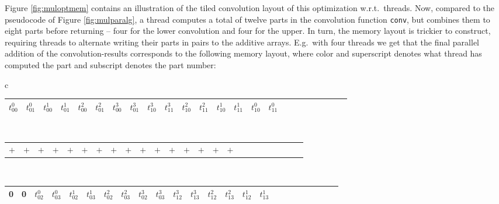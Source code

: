Figure \ref{fig:muloptmem} contains an illustration of the tiled convolution
layout of this optimization w.r.t.\ threads. Now, compared to the pseudocode of
Figure \ref{fig:mulparalg}, a thread computes a total of twelve parts in the
convolution function \texttt{conv}, but combines them to eight parts before
returning -- four for the lower convolution and four for the upper. In turn, the
memory layout is trickier to construct, requiring threads to alternate writing
their parts in pairs to the additive arrays. E.g.\ with four threads we get that
the final parallel addition of the convolution-results corresponds to the
following memory layout, where color and superscript denotes what thread has
computed the part and subscript denotes the part number:

\begin{center}
  \small
  \begin{tabular}{c}
    \begin{tabular}{|C{0.4cm}|C{0.4cm}|C{0.4cm}|C{0.4cm}|C{0.4cm}|C{0.4cm}|C{0.4cm}|C{0.4cm}|C{0.4cm}|C{0.4cm}|C{0.4cm}|C{0.4cm}|C{0.4cm}|C{0.4cm}|C{0.4cm}|C{0.4cm}|C{0.4cm}|C{0.4cm}|C{0.4cm}|C{0.4cm}|C{0.4cm}|C{0.4cm}|C{0.4cm}|C{0.4cm}|}
      \hline
      \color{Crimson}$t^0_{00}$ & \color{Crimson}$t^0_{01}$ & \color{RoyalBlue}$t^1_{00}$ & \color{RoyalBlue}$t^1_{01}$  & \color{ForestGreen}$t^2_{00}$ & \color{ForestGreen}$t^2_{01}$  & \color{Chocolate}$t^3_{00}$ & \color{Chocolate}$t^3_{01}$  & \color{Chocolate}$t^3_{10}$ & \color{Chocolate}$t^3_{11}$  & \color{ForestGreen}$t^2_{10}$ & \color{ForestGreen}$t^2_{11}$  & \color{RoyalBlue}$t^1_{10}$ & \color{RoyalBlue}$t^1_{11}$ & \color{Crimson}$t^0_{10}$ & \color{Crimson}$t^0_{11}$ \\
      \hline
    \end{tabular}\\
    \begin{tabular}{C{0.41cm}C{0.41cm}C{0.41cm}C{0.41cm}C{0.41cm}C{0.41cm}C{0.41cm}C{0.41cm}C{0.41cm}C{0.41cm}C{0.41cm}C{0.41cm}C{0.41cm}C{0.41cm}C{0.41cm}C{0.41cm}C{0.41cm}C{0.41cm}C{0.41cm}C{0.41cm}C{0.41cm}C{0.41cm}C{0.41cm}C{0.41cm}}
      $+$ & $+$ & $+$ & $+$  & $+$ & $+$ & $+$ & $+$  & $+$ & $+$ & $+$ & $+$  & $+$ & $+$ & $+$ & $+$
    \end{tabular}\\
    \begin{tabular}{|C{0.4cm}|C{0.4cm}|C{0.4cm}|C{0.4cm}|C{0.4cm}|C{0.4cm}|C{0.4cm}|C{0.4cm}|C{0.4cm}|C{0.4cm}|C{0.4cm}|C{0.4cm}|C{0.4cm}|C{0.4cm}|C{0.4cm}|C{0.4cm}|C{0.4cm}|C{0.4cm}|C{0.4cm}|C{0.4cm}|C{0.4cm}|C{0.4cm}|C{0.4cm}|C{0.4cm}|}
       & 0 & \color{Crimson}$t^0_{02}$ & \color{Crimson}$t^0_{03}$  & \color{RoyalBlue}$t^1_{02}$ & \color{RoyalBlue}$t^1_{03}$ & \color{ForestGreen}$t^2_{02}$ & \color{ForestGreen}$t^2_{03}$ & \color{Chocolate}$t^3_{02}$ & \color{Chocolate}$t^3_{03}$ & \color{Chocolate}$t^3_{12}$ & \color{Chocolate}$t^3_{13}$ & \color{ForestGreen}$t^2_{12}$ & \color{ForestGreen}$t^2_{13}$ & \color{RoyalBlue}$t^1_{12}$ & \color{RoyalBlue}$t^1_{13}$ \\
      \hline
    \end{tabular}
  \end{tabular}
\end{center}~

